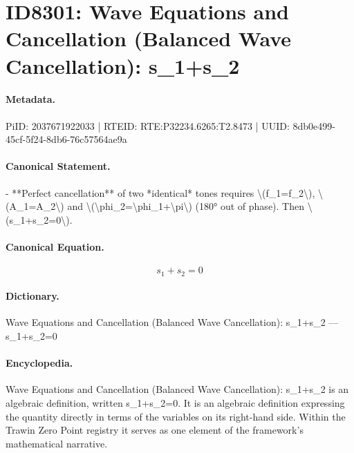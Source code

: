 \section*{ID8301: Wave Equations and Cancellation (Balanced Wave Cancellation): s\_1+s\_2}
\paragraph{Metadata.}
PiID: 2037671922033 | RTEID: RTE:P32234.6265:T2.8473 | UUID: 8db0e499-45cf-5f24-8db6-76c57564ae9a

\paragraph{Canonical Statement.}
- **Perfect cancellation** of two *identical* tones requires \textbackslash{}(f\_1=f\_2\textbackslash{}), \textbackslash{}(A\_1=A\_2\textbackslash{}) and \textbackslash{}(\textbackslash{}phi\_2=\textbackslash{}phi\_1+\textbackslash{}pi\textbackslash{}) (180° out of phase). Then \textbackslash{}(s\_1+s\_2=0\textbackslash{}).

\paragraph{Canonical Equation.}
\[
s_1+s_2=0
\]

\paragraph{Dictionary.}
Wave Equations and Cancellation (Balanced Wave Cancellation): s\_1+s\_2 — s\_1+s\_2=0

\paragraph{Encyclopedia.}
Wave Equations and Cancellation (Balanced Wave Cancellation): s\_1+s\_2 is an algebraic definition, written s\_1+s\_2=0. It is an algebraic definition expressing the quantity directly in terms of the variables on its right-hand side. Within the Trawin Zero Point registry it serves as one element of the framework's mathematical narrative.
